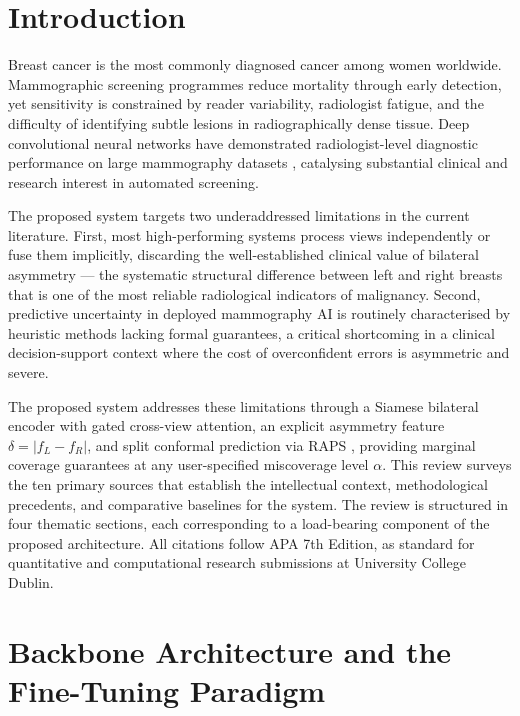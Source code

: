 \documentclass[12pt, a4paper]{article}
\begin{document}
\newpage
\tableofcontents
\newpage

\section{Introduction}

Breast cancer is the most commonly diagnosed cancer among women worldwide.
Mammographic screening programmes reduce mortality through early detection, yet
sensitivity is constrained by reader variability, radiologist fatigue, and the
difficulty of identifying subtle lesions in radiographically dense tissue.
Deep convolutional neural networks have demonstrated radiologist-level
diagnostic performance on large mammography datasets
\parencite{McKinney2020, Wu2019}, catalysing substantial clinical and research
interest in automated screening.

The proposed system targets two underaddressed limitations in the current
literature. First, most high-performing systems process views independently or
fuse them implicitly, discarding the well-established clinical value of
bilateral asymmetry --- the systematic structural difference between left and
right breasts that is one of the most reliable radiological indicators of
malignancy. Second, predictive uncertainty in deployed mammography AI is
routinely characterised by heuristic methods lacking formal guarantees, a
critical shortcoming in a clinical decision-support context where the cost
of overconfident errors is asymmetric and severe.

The proposed system addresses these limitations through a Siamese bilateral
encoder with gated cross-view attention, an explicit asymmetry feature
$\delta = |f_L - f_R|$, and split conformal prediction via RAPS
\parencite{Romano2020}, providing marginal coverage guarantees at any
user-specified miscoverage level $\alpha$.
This review surveys the ten primary sources that establish the intellectual
context, methodological precedents, and comparative baselines for the system.
The review is structured in four thematic sections, each corresponding to a
load-bearing component of the proposed architecture.
All citations follow APA 7th Edition, as standard for quantitative and
computational research submissions at University College Dublin.

\section{Backbone Architecture and the Fine-Tuning Paradigm}
\end{document}
